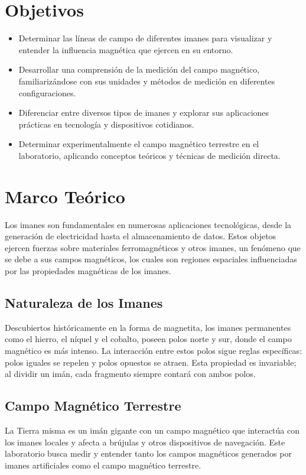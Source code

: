 \section{Objetivos}
\begin{itemize}
    \item Determinar las líneas de campo de diferentes imanes para visualizar y entender la influencia magnética que ejercen en su entorno.
    \item Desarrollar una comprensión de la medición del campo magnético, familiarizándose con sus unidades y métodos de medición en diferentes configuraciones.
    \item Diferenciar entre diversos tipos de imanes y explorar sus aplicaciones prácticas en tecnología y dispositivos cotidianos.
    \item Determinar experimentalmente el campo magnético terrestre en el laboratorio, aplicando conceptos teóricos y técnicas de medición directa.
\end{itemize}

\section{Marco Teórico}
Los imanes son fundamentales en numerosas aplicaciones tecnológicas, desde la generación de electricidad hasta el almacenamiento de datos. Estos objetos ejercen fuerzas sobre materiales ferromagnéticos y otros imanes, un fenómeno que se debe a sus campos magnéticos, los cuales son regiones espaciales influenciadas por las propiedades magnéticas de los imanes.

\subsection{Naturaleza de los Imanes}
Descubiertos históricamente en la forma de magnetita, los imanes permanentes como el hierro, el níquel y el cobalto, poseen polos norte y sur, donde el campo magnético es más intenso. La interacción entre estos polos sigue reglas específicas: polos iguales se repelen y polos opuestos se atraen. Esta propiedad es invariable; al dividir un imán, cada fragmento siempre contará con ambos polos.

\subsection{Campo Magnético Terrestre}
La Tierra misma es un imán gigante con un campo magnético que interactúa con los imanes locales y afecta a brújulas y otros dispositivos de navegación. Este laboratorio busca medir y entender tanto los campos magnéticos generados por imanes artificiales como el campo magnético terrestre.

